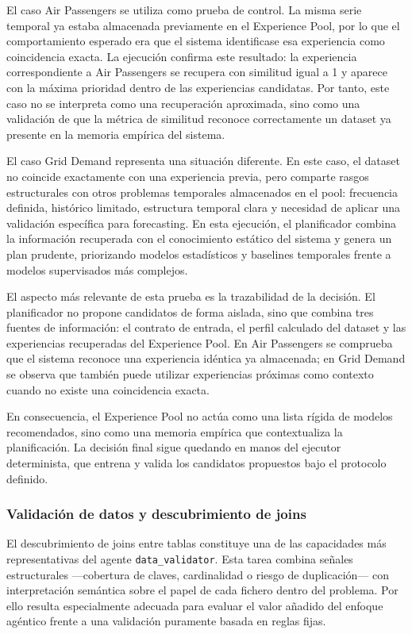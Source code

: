 \documentclass[12pt,a4paper]{article}
\theoremstyle{plain}
\begin{document}
El caso Air Passengers se utiliza como prueba de control. La misma serie temporal ya estaba almacenada previamente en el Experience Pool, por lo que el comportamiento esperado era que el sistema identificase esa experiencia como coincidencia exacta. La ejecución confirma este resultado: la experiencia correspondiente a Air Passengers se recupera con similitud igual a 1 y aparece con la máxima prioridad dentro de las experiencias candidatas. Por tanto, este caso no se interpreta como una recuperación aproximada, sino como una validación de que la métrica de similitud reconoce correctamente un dataset ya presente en la memoria empírica del sistema.

El caso Grid Demand representa una situación diferente. En este caso, el dataset no coincide exactamente con una experiencia previa, pero comparte rasgos estructurales con otros problemas temporales almacenados en el pool: frecuencia definida, histórico limitado, estructura temporal clara y necesidad de aplicar una validación específica para forecasting. En esta ejecución, el planificador combina la información recuperada con el conocimiento estático del sistema y genera un plan prudente, priorizando modelos estadísticos y baselines temporales frente a modelos supervisados más complejos.

El aspecto más relevante de esta prueba es la trazabilidad de la decisión. El planificador no propone candidatos de forma aislada, sino que combina tres fuentes de información: el contrato de entrada, el perfil calculado del dataset y las experiencias recuperadas del Experience Pool. En Air Passengers se comprueba que el sistema reconoce una experiencia idéntica ya almacenada; en Grid Demand se observa que también puede utilizar experiencias próximas como contexto cuando no existe una coincidencia exacta.

En consecuencia, el Experience Pool no actúa como una lista rígida de modelos recomendados, sino como una memoria empírica que contextualiza la planificación. La decisión final sigue quedando en manos del ejecutor determinista, que entrena y valida los candidatos propuestos bajo el protocolo definido.

\subsubsection{Validación de datos y descubrimiento de joins}
\label{sec:caso-joins}

El descubrimiento de joins entre tablas constituye una de las capacidades más representativas del agente \texttt{data\_validator}. Esta tarea combina señales estructurales —cobertura de claves, cardinalidad o riesgo de duplicación— con interpretación semántica sobre el papel de cada fichero dentro del problema. Por ello resulta especialmente adecuada para evaluar el valor añadido del enfoque agéntico frente a una validación puramente basada en reglas fijas.
\end{document}
